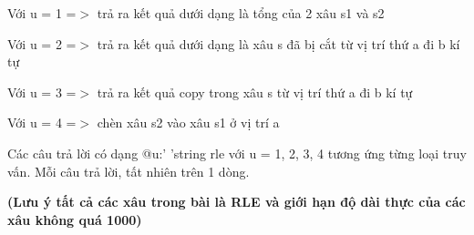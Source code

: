 Với u = 1 =$>$ trả ra kết quả dưới dạng là tổng của 2 xâu s1 và s2

Với u = 2 =$>$ trả ra kết quả dưới dạng là xâu s đã bị cắt từ vị trí thứ a đi b kí tự

Với u = 3 =$>$ trả ra kết quả copy trong xâu s từ vị trí thứ a đi b kí tự

Với u = 4 =$>$ chèn xâu s2 vào xâu s1 ở vị trí a

Các câu trả lời có dạng @u:' 'string rle với u = 1, 2, 3, 4 tương ứng từng loại truy vấn. Mỗi câu trả lời, tất nhiên trên 1 dòng.

\textbf{(Lưu ý tất cả các xâu trong bài là RLE và giới hạn độ dài thực của các xâu không quá 1000) }\textbf{}

\